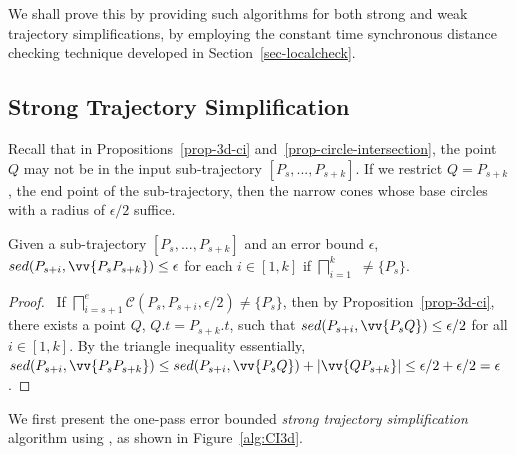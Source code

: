 We shall prove this by providing such algorithms for both strong and weak trajectory simplifications, by employing the constant time synchronous distance checking technique developed in Section~\ref{sec-localcheck}.



\subsection{Strong Trajectory Simplification}




Recall that in Propositions~\ref{prop-3d-ci} and~\ref{prop-circle-intersection}, the point $Q$ may not be in the input sub-trajectory $[P_s,...,P_{s+k}]$.
If we restrict $Q=P_{s+k}$, the end point of the sub-trajectory, then the narrow cones whose base circles with a radius of $\epsilon/2$ suffice.

\begin{prop}
\label{prop-3d-ci-half}
Given a sub-trajectory $[P_s,...,P_{s+k}]$ and an error bound $\epsilon$, $sed(P_{s+i}, \vv{P_sP_{s+k}})\le \epsilon$ for each $i \in [1,k]$ if  $\bigsqcap_{i=1}^{k}$ $\ne \{P_s\}$.
\end{prop}


\begin{proof}\ 
If $\bigsqcap_{i=s+1}^{e}{\mathcal{C}(P_s, P_{s+i}, \epsilon/2)} \ne \{P_s\}$, then by Proposition~\ref{prop-3d-ci}, there exists a point $Q$, $Q.t = P_{s+k}.t$, such that $sed(P_{s+i}, \vv{P_sQ})\le \epsilon/2$ for all $i \in [1,k]$. By the triangle inequality essentially, $sed(P_{s+i}, \vv{P_sP_{s+k}})\le  sed(P_{s+i}, \vv{P_sQ}) + |\vv{QP_{s+k}}| \le  \epsilon/2+\epsilon/2 = \epsilon$. \eop
\end{proof}


 We first present the  one-pass error bounded {\em strong trajectory simplification} algorithm using \sed, as shown in Figure~\ref{alg:CI3d}.



